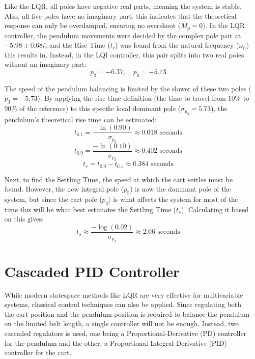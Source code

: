 Like the LQR, all poles have negative real parts, meaning the system is stable. Also, all five poles have no imaginary part, this indicates that the theoretical response can only be overdamped, ensuring no overshoot  ($M_p = 0$). In the LQR controller, the pendulum movements were decided by the complex pole pair at $-5.98 \pm 0.68i$, and the Rise Time ($t_r$) was found from the natural frequency ($\omega_n$) this results in. Instead, in the LQI controller, this pair splits into two real poles without an imaginary part:
\begin{equation}
	p_2 = -6.37, \quad p_3 = -5.73
\end{equation}

The speed of the pendulum balancing is limited by the slower of these two poles ($p_3 = -5.73$). By applying the rise time definition (the time to travel from $10\%$ to $90\%$ of the reference) to this specific local dominant pole ($\sigma_{p_3} = 5.73$), the pendulum's theoretical rise time can be estimated:
\begin{equation}
	t_{0.1} = \frac{-\ln(0.90)}{\sigma_{p_3}} \approx 0.018 \text{ seconds}
\end{equation}
\begin{equation}
	t_{0.9} = \frac{-\ln(0.10)}{\sigma_{p_3}} \approx 0.402 \text{ seconds}
\end{equation}
\begin{equation}
	t_r = t_{0.9} - t_{0.1} \approx 0.384 \text{ seconds}
\end{equation}

Next, to find the Settling Time, the speed at which the cart settles must be found. However, the new integral pole ($p_5$) is now the dominant pole of the system, but since the cart pole ($p_4$) is what affects the system for most of the time this will be what best estimates the Settling Time ($t_s$). Calculating it based on this gives:
\begin{equation}
	t_s \approx \frac{-\log(0.02)}{\sigma_{p_4}} \approx 2.06 \text{ seconds}
\end{equation}

\section{Cascaded PID Controller}
While modern statespace methods like LQR are very effective for multivariable systems, classical control techniques can also be applied. Since regulating both the cart position and the pendulum position is required to balance the pendulum on the limited belt length, a single controller will not be enough. Instead, two cascaded regulators is used, one being a Proportional-Derivative (PD) controller for the pendulum and the other, a Proportional-Integral-Derivative (PID) controller for the cart.

